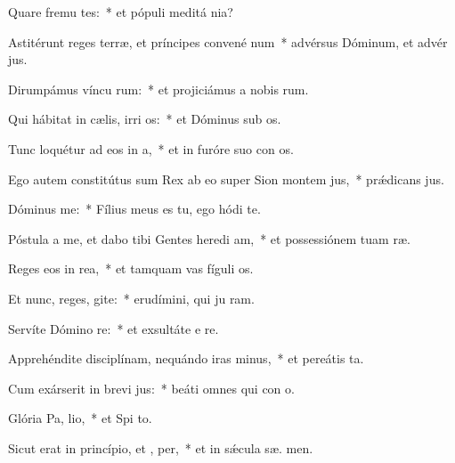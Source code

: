 \item Quare fremu tes:~* et pópuli meditá  nia?
\item Astitérunt reges terræ, et príncipes convené  num~* advérsus Dóminum, et advér  jus.
\item Dirumpámus víncu rum:~* et projiciámus a nobis  rum.
\item Qui hábitat in cælis, irri os:~* et Dóminus sub os.
\item Tunc loquétur ad eos in  a,~* et in furóre suo con os.
\item Ego autem constitútus sum Rex ab eo super Sion montem  jus,~* prǽdicans  jus.
\item Dóminus   me:~* Fílius meus es tu, ego hódi  te.
\item Póstula a me, et dabo tibi Gentes heredi am,~* et possessiónem tuam  ræ.
\item Reges eos in  rea,~* et tamquam vas fíguli  os.
\item Et nunc, reges, gite:~* erudímini, qui ju ram.
\item Servíte Dómino  re:~* et exsultáte e  re.
\item Apprehéndite disciplínam, nequándo iras minus,~* et pereátis   ta.
\item Cum exárserit in brevi  jus:~* beáti omnes qui con  o.
\item Glória Pa,  lio,~* et Spi to.
\item Sicut erat in princípio, et ,  per,~* et in sǽcula sæ. men.
